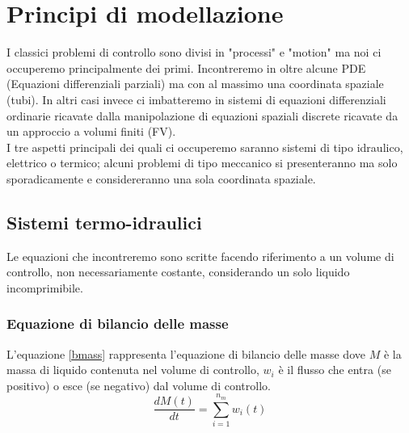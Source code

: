 \label{capitolo2}
\section{Principi di modellazione}
I classici problemi di controllo sono divisi in "processi" e "motion" ma noi ci occuperemo principalmente dei primi. Incontreremo in oltre alcune PDE (Equazioni differenziali parziali) ma con al massimo una coordinata spaziale (tubi). In altri casi invece ci imbatteremo in sistemi di equazioni differenziali ordinarie ricavate dalla manipolazione di equazioni spaziali discrete ricavate da un approccio a volumi finiti (FV).\\
I tre aspetti principali dei quali ci occuperemo saranno sistemi di tipo idraulico, elettrico o termico; alcuni problemi di tipo meccanico si presenteranno ma solo sporadicamente e considereranno una sola coordinata spaziale.
\subsection{Sistemi termo-idraulici}
Le equazioni che incontreremo sono scritte facendo riferimento a un volume di controllo, non necessariamente costante, considerando un solo liquido incomprimibile.
\subsubsection{Equazione di bilancio delle masse}
L'equazione \ref{bmass} rappresenta l'equazione di bilancio delle masse dove $M$ è la massa di liquido contenuta nel volume di controllo, $w_i$ è il flusso che entra (se positivo) o esce (se negativo) dal volume di controllo.
\begin{equation}
\label{bmass}
\frac{dM(t)}{dt}=\sum_{i=1}^{n_m}w_i(t)
\end{equation}

